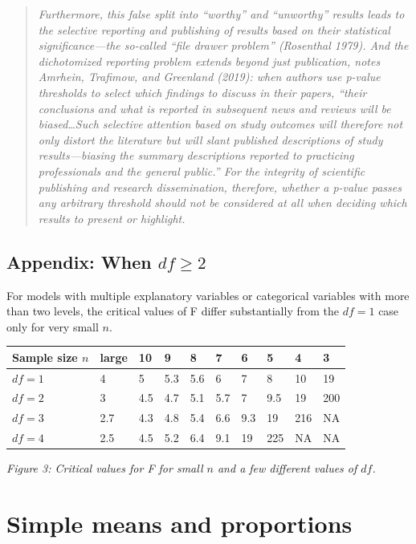 \documentclass[]{tufte-book}
\begin{document}
\begin{quote}
\emph{Furthermore, this false split into ``worthy'' and ``unworthy'' results leads to the selective reporting and publishing of results based on their statistical significance---the so-called ``file drawer problem'' (Rosenthal 1979). And the dichotomized reporting problem extends beyond just publication, notes Amrhein, Trafimow, and Greenland (2019): when authors use p-value thresholds to select which findings to discuss in their papers, ``their conclusions and what is reported in subsequent news and reviews will be biased\ldots{}Such selective attention based on study outcomes will therefore not only distort the literature but will slant published descriptions of study results---biasing the summary descriptions reported to practicing professionals and the general public.'' For the integrity of scientific publishing and research dissemination, therefore, whether a p-value passes any arbitrary threshold should not be considered at all when deciding which results to present or highlight.}
\end{quote}

\hypertarget{appendix-when-df-geq-2}{%
\section{\texorpdfstring{Appendix: When \(df \geq 2\)}{Appendix: When df \textbackslash{}geq 2}}\label{appendix-when-df-geq-2}}

For models with multiple explanatory variables or categorical variables with more than two levels, the critical values of F differ substantially from the \(df = 1\) case only for very small \(n\).

\begin{longtable}[]{@{}llllllllll@{}}
\toprule
Sample size \(n\) & large & 10 & 9 & 8 & 7 & 6 & 5 & 4 & 3\tabularnewline
\midrule
\endhead
\(df = 1\) & 4 & 5 & 5.3 & 5.6 & 6 & 7 & 8 & 10 & 19\tabularnewline
\(df = 2\) & 3 & 4.5 & 4.7 & 5.1 & 5.7 & 7 & 9.5 & 19 & 200\tabularnewline
\(df = 3\) & 2.7 & 4.3 & 4.8 & 5.4 & 6.6 & 9.3 & 19 & 216 & NA\tabularnewline
\(df = 4\) & 2.5 & 4.5 & 5.2 & 6.4 & 9.1 & 19 & 225 & NA & NA\tabularnewline
\bottomrule
\end{longtable}

\emph{Figure 3: Critical values for F for small \(n\) and a few different values of \(df\).}

\hypertarget{simple-means-and-proportions}{%
\chapter{Simple means and proportions}\label{simple-means-and-proportions}}
\end{document}
